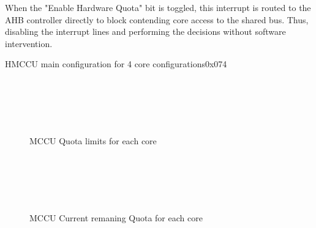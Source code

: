 When the "Enable Hardware Quota" bit is toggled, this interrupt is routed to the AHB controller directly to block contending core access to the shared bus. Thus, disabling the interrupt lines and performing the decisions without software intervention.


\begin{register}{H}{MCCU main configuration for 4 core configurations}{0x074}
	\label{MCCU_cfg}
	\regnewline
\end{register}

\begin{figure}[H]
	\begin{center}
		 \\
		 \\
		 \\
		 \\
	\end{center}
	\caption{MCCU Quota limits for each core}\label{fig:MCCU_lim}
\end{figure}
\begin{figure}[H]
	\begin{center}
		 \\
		 \\
		 \\
		 \\
	\end{center}
	\caption{MCCU Current remaning Quota for each core}\label{fig:MCCU_ava}
\end{figure}

